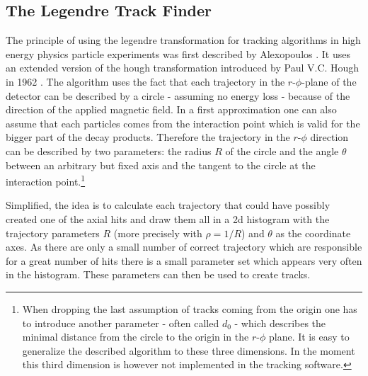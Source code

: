 \subsection{The Legendre Track Finder}
The principle of using the legendre transformation for tracking algorithms in high energy physics particle experiments was first described by Alexopoulos \cite{legendre}. It uses an extended version of the hough transformation introduced by Paul V.C. Hough in 1962 \cite{hough}. The algorithm uses the fact that each trajectory in the $r$-$\phi$-plane of the detector can be described by a circle - assuming no energy loss - because of the direction of the applied magnetic field. In a first approximation one can also assume that each particles comes from the interaction point which is valid for the bigger part of the decay products. Therefore the trajectory in the $r$-$\phi$ direction can be described by two parameters: the radius $R$ of the circle and the angle $\theta$ between an arbitrary but fixed axis and the tangent to the circle at the interaction point.\footnote{When dropping the last assumption of tracks coming from the origin one has to introduce another parameter - often called $d_0$ - which describes the minimal distance from the circle to the origin in the $r$-$\phi$ plane. It is easy to generalize the described algorithm to these three dimensions. In the moment this third dimension is however not implemented in the tracking software.}

Simplified, the idea is to calculate each trajectory that could have possibly created one of the axial hits and draw them all in a 2d histogram with the trajectory parameters $R$ (more precisely with $\rho = 1/R$) and $\theta$ as the coordinate axes. As there are only a small number of correct trajectory which are responsible for a great number of hits there is a small parameter set which appears very often in the histogram. These parameters can then be used to create tracks.

